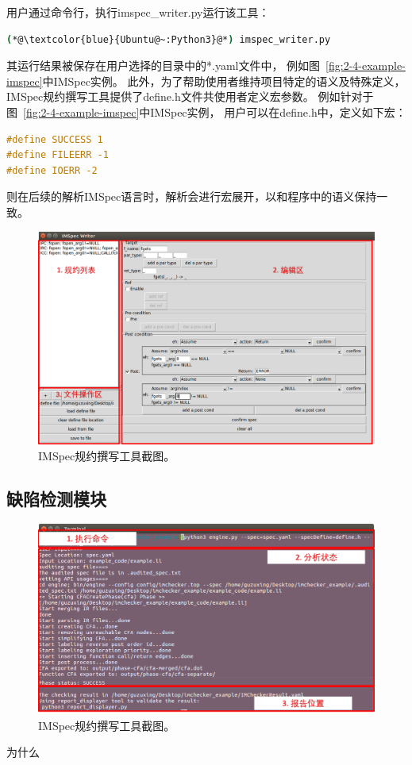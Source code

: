 用户通过命令行，执行imspec\_writer.py运行该工具：
\begin{lstlisting}[language={bash},
basicstyle=\linespread{0.8}\listingsfont,
numbers=none,
xleftmargin=.3\textwidth]
(*@\textcolor{blue}{Ubuntu@~:Python3}@*) imspec_writer.py
\end{lstlisting}
其运行结果被保存在用户选择的目录中的*.yaml文件中，
例如图~\ref{fig:2-4-example-imspec}中IMSpec实例。
此外，为了帮助使用者维持项目特定的语义及特殊定义，
IMSpec规约撰写工具提供了define.h文件共使用者定义宏参数。
例如针对于图~\ref{fig:2-4-example-imspec}中IMSpec实例，
用户可以在define.h中，定义如下宏：
\begin{lstlisting}[language={C},
basicstyle=\linespread{0.8}\listingsfont,
numbers=none,
xleftmargin=.3\textwidth]
#define SUCCESS 1
#define FILEERR -1
#define IOERR -2
\end{lstlisting}
则在后续的解析IMSpec语言时，解析会进行宏展开，以和程序中的语义保持一致。

\begin{figure}[t]
	\centering
	\includegraphics[width=0.85\linewidth]{figures/cp4-IMSpec-writer.png}
	\caption{
		IMSpec规约撰写工具截图。
	}
	\label{fig:4-3-IMSpec-writer}
\end{figure}


\subsection{缺陷检测模块}
\begin{figure}[b]
	\centering
	\includegraphics[width=0.85\linewidth]{figures/cp4-IMChecker-engine.png}
	\caption{
		IMSpec规约撰写工具截图。
	}
	\label{fig:4-3-IMChecker-engine}
\end{figure}
为什么

